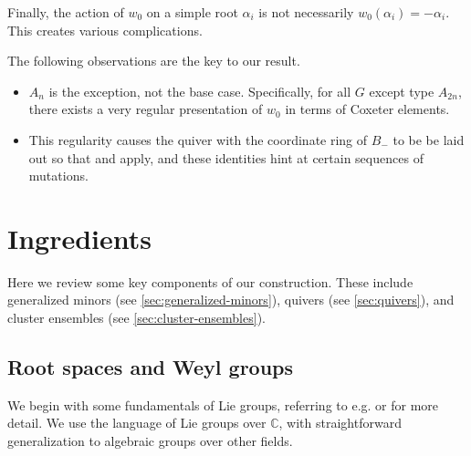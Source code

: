 \documentclass{amsart}
\theoremstyle{plain}
\theoremstyle{definition}
\theoremstyle{remark}
\begin{document}
  Finally, the action of $w_0$ on a simple root $\alpha_i$ is not
  necessarily $w_0(\alpha_i) = -\alpha_i$. This creates various
  complications.

  The following observations are the key to our result.

  \begin{itemize}
  \item
    $A_n$ is the exception, not the base case. Specifically, for all $G$
    except type $A_{2n}$, there exists a very regular presentation of
    $w_0$ in terms of Coxeter elements.
  \item
    This regularity causes the quiver with the coordinate ring of
    $B_{-}$ to be be laid out so that
    \cite[Theorem~1.17]{fominzelevinsky1999} and
    \cite[Theorem~1.5]{yangzelevinsky2008} apply, and these identities
    hint at certain sequences of mutations.
  \end{itemize}

  \section{Ingredients}

  \label{sec:ingredients}

  Here we review some key components of our construction. These include
  generalized minors (see \cref{sec:generalized-minors}), quivers (see
  \cref{sec:quivers}), and cluster ensembles (see
  \cref{sec:cluster-ensembles}).

  \subsection{Root spaces and Weyl groups}

  \label{sec:lie-groups}

  We begin with some fundamentals of Lie groups, referring to e.g.
  \cite[Chapter~II]{knapp1996} or \cite{bourbaki2002_46} for more
  detail. We use the language of Lie groups over $\mathbb{C}$, with
  straightforward generalization to algebraic groups over other fields.
\end{document}

